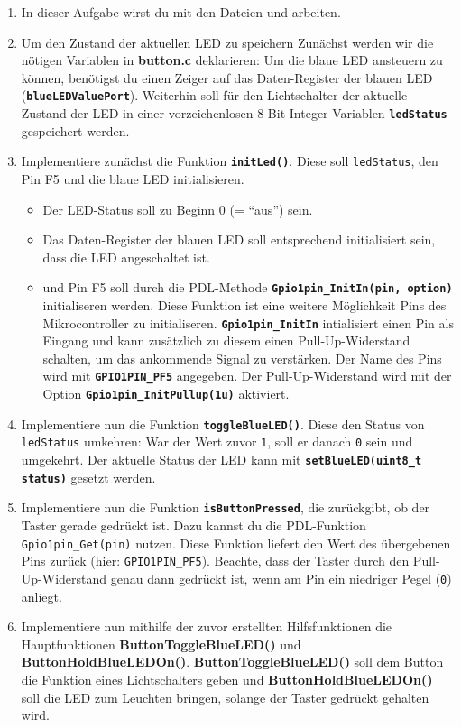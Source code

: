 \begin{enumerate}
\item 
In dieser Aufgabe wirst du mit den Dateien  und  arbeiten.

\item 
Um den Zustand der aktuellen LED zu speichern
Zunächst werden wir die nötigen Variablen in \textbf{button.c} deklarieren:
Um die blaue LED ansteuern zu können, benötigst du einen Zeiger auf das Daten-Register der blauen LED (\textbf{\lstinline|blueLEDValuePort|}).
Weiterhin soll für den Lichtschalter der aktuelle Zustand der LED in einer vorzeichenlosen 8-Bit-Integer-Variablen \textbf{\lstinline|ledStatus|} gespeichert werden.

\item
Implementiere zunächst die Funktion \textbf{\lstinline|initLed()|}.
Diese soll \lstinline|ledStatus|, den Pin F5 und die blaue LED initialisieren.
\begin{itemize}
\item 
Der LED-Status soll zu Beginn 0 (= \enquote{aus}) sein.
\item 
Das Daten-Register der blauen LED soll entsprechend initialisiert sein, dass die LED angeschaltet ist.
\item 
und Pin F5 soll durch die PDL-Methode \textbf{\lstinline|Gpio1pin_InitIn(pin, option)|} initialiseren werden.
Diese Funktion ist eine weitere Möglichkeit Pins des Mikrocontroller zu initialiseren. 
\textbf{\lstinline|Gpio1pin_InitIn|} intialisiert einen Pin als Eingang und kann zusätzlich zu diesem einen Pull-Up-Widerstand schalten, um das ankommende Signal zu verstärken.
Der Name des Pins wird mit \textbf{\lstinline|GPIO1PIN_PF5|} angegeben.
Der Pull-Up-Widerstand wird mit der Option \textbf{\lstinline|Gpio1pin_InitPullup(1u)|} aktiviert.
\end{itemize}

\item
Implementiere nun die Funktion \textbf{\lstinline|toggleBlueLED()|}.
Diese den Status von \lstinline|ledStatus| umkehren:
War der Wert zuvor \lstinline|1|, soll er danach \lstinline|0| sein und umgekehrt.
Der aktuelle Status der LED kann mit \textbf{\lstinline|setBlueLED(uint8_t status)|} gesetzt werden. 

\item 
Implementiere nun die Funktion \textbf{\lstinline|isButtonPressed|}, die zurückgibt, ob der Taster gerade gedrückt ist.
Dazu kannst du die PDL-Funktion \lstinline|Gpio1pin_Get(pin)| nutzen.
Diese Funktion liefert den Wert des übergebenen Pins zurück (hier: \lstinline|GPIO1PIN_PF5|).
Beachte, dass der Taster durch den Pull-Up-Widerstand genau dann gedrückt ist, wenn am Pin ein niedriger Pegel (\lstinline|0|) anliegt.

\item
Implementiere nun mithilfe der zuvor erstellten Hilfsfunktionen die Hauptfunktionen \textbf{ButtonToggleBlueLED()} und \textbf{ButtonHoldBlueLEDOn()}.
\textbf{ButtonToggleBlueLED()} soll dem Button die Funktion eines Lichtschalters geben und  \textbf{ButtonHoldBlueLEDOn()} soll die LED zum Leuchten bringen, solange der Taster gedrückt gehalten wird. 

\end{enumerate}
